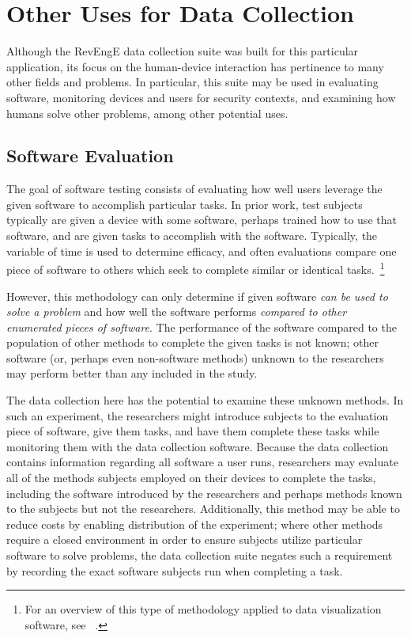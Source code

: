 \section{Other Uses for Data Collection} \label{otheruses}

Although the RevEngE data collection suite was built for this particular application, its focus on the human-device interaction has pertinence to many other fields and problems.  In particular, this suite may be used in evaluating software, monitoring devices and users for security contexts, and examining how humans solve other problems, among other potential uses.

\subsection{Software Evaluation}

The goal of software testing consists of evaluating how well users leverage the given software to accomplish particular tasks.  In prior work, test subjects typically are given a device with some software, perhaps trained how to use that software, and are given tasks to accomplish with the software.  Typically, the variable of time is used to determine efficacy, and often evaluations compare one piece of software to others which seek to complete similar or identical tasks.~\footnote{For an overview of this type of methodology applied to data visualization software, see ~\cite{plaisant2004challenge}.}

However, this methodology can only determine if given software \textit{can be used to solve a problem} and how well the software performs \textit{compared to other enumerated pieces of software}.  The performance of the software compared to the population of other methods to complete the given tasks is not known; other software (or, perhaps even non-software methods) unknown to the researchers may perform better than any included in the study.

The data collection here has the potential to examine these unknown methods.  In such an experiment, the researchers might introduce subjects to the evaluation piece of software, give them tasks, and have them complete these tasks while monitoring them with the data collection software.  Because the data collection contains information regarding all software a user runs, researchers may evaluate all of the methods subjects employed on their devices to complete the tasks, including the software introduced by the researchers and perhaps methods known to the subjects but not the researchers.  Additionally, this method may be able to reduce costs by enabling distribution of the experiment; where other methods require a closed environment in order to ensure subjects utilize particular software to solve problems, the data collection suite negates such a requirement by recording the exact software subjects run when completing a task.

